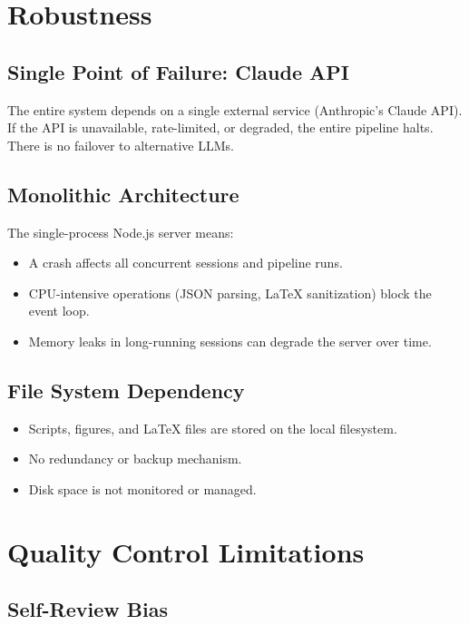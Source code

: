 \section{Robustness}
\label{sec:weak:robustness}

\subsection{Single Point of Failure: Claude API}

The entire system depends on a single external service (Anthropic's Claude API).
If the API is unavailable, rate-limited, or degraded, the entire pipeline halts.
There is no failover to alternative LLMs.

\subsection{Monolithic Architecture}

The single-process Node.js server means:
\begin{itemize}
  \item A crash affects all concurrent sessions and pipeline runs.
  \item CPU-intensive operations (JSON parsing, \LaTeX{} sanitization) block the event loop.
  \item Memory leaks in long-running sessions can degrade the server over time.
\end{itemize}

\subsection{File System Dependency}

\begin{itemize}
  \item Scripts, figures, and \LaTeX{} files are stored on the local filesystem.
  \item No redundancy or backup mechanism.
  \item Disk space is not monitored or managed.
\end{itemize}

\section{Quality Control Limitations}
\label{sec:weak:quality}

\subsection{Self-Review Bias}

